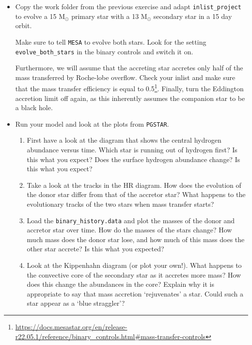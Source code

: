 \documentclass[11pt,a4paper]{article}
\begin{document}
\begin{itemize}
\item Copy the work folder from the previous exercise and adapt \verb|inlist_project| to evolve a 15 M$_\odot$ primary star with a 13 M$_\odot$ secondary star in a 15 day orbit. 

Make sure to tell \texttt{MESA} to evolve both stars. 
Look for the setting \verb|evolve_both_stars| in the binary controls and switch it on. 

Furthermore, we will assume that the accreting star accretes only half of the mass transferred by Roche-lobe overflow. Check your inlist and make sure that the mass transfer efficiency is equal to 0.5\footnote{\url{https://docs.mesastar.org/en/release-r22.05.1/reference/binary_controls.html\#mass-transfer-controls}}. Finally, turn the Eddington accretion limit off again, as this inherently assumes the companion star to be a black hole.

\item Run your model and look at the plots from \texttt{PGSTAR}.

\begin{enumerate}[label=(\alph*)]
\item First have a look at the diagram that shows the central hydrogen abundance versus time. Which star is running out of hydrogen first? Is this what you expect? Does the surface hydrogen abundance change? Is this what you expect?

\item Take a look at the tracks in the HR diagram. How does the evolution of the donor star differ from that of the accretor star? What happens to the evolutionary tracks of the two stars when mass transfer starts?

\item Load the \texttt{binary\_history.data} and plot the masses of the donor and accretor star over time.  
How do the masses of the stars change? How much mass does the donor star lose, and how much of this mass does the other star accrete? Is this what you expected? 


\item Look at the Kippenhahn diagram (or plot your own!). 
What happens to the convective core of the secondary star as it accretes more mass? How does this change the abundances in the core? Explain why it is appropriate to say that mass accretion `rejuvenates' a star. Could such a star appear as a `blue straggler'?
\end{enumerate}

\end{itemize}






% 
% 
\end{document}
